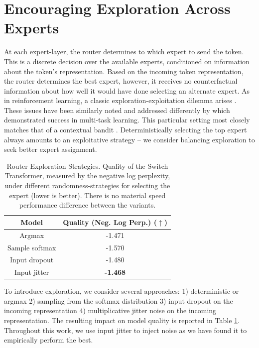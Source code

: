 \documentclass[twoside,11pt]{article}
\begin{document}
\section{Encouraging Exploration Across Experts}
At each expert-layer, the router determines to which expert to send the token.
This is a discrete decision over the available experts, conditioned on information about the token's representation.
Based on the incoming token representation, the router determines the best expert, however, it receives no counterfactual information about how well it would have done selecting an alternate expert.
As in reinforcement learning, a classic exploration-exploitation dilemma arises \citep{sutton2018reinforcement}.
These issues have been similarly noted and addressed differently by \cite{rosenbaum2017routing} which demonstrated success in multi-task learning.
This particular setting most closely matches that of a contextual bandit \citep{robbins1952some}.
Deterministically selecting the top expert always amounts to an exploitative strategy -- we consider balancing exploration to seek better expert assignment.


\begin{center}
\begin{table}[ht!]
\centering
\begin{tabular}{cc}
    \toprule
    {Model} & {Quality (Neg. Log Perp.) ($\uparrow$)}\\ \hline
    Argmax  & -1.471 \\ 
    Sample softmax  & -1.570 \\ 
    Input dropout  & -1.480 \\ 
    Input jitter  & \textbf{-1.468} \\ 
    \bottomrule
\end{tabular}
\caption{Router Exploration Strategies. Quality of the Switch Transformer, measured by the negative log perplexity, under different randomness-strategies for selecting the expert (lower is better). There is no material speed performance difference between the variants.}
\label{tab: top1_noise}
\end{table}
\end{center}

To introduce exploration, we consider several approaches: 1) deterministic or argmax 2) sampling from the softmax distribution 3) input dropout on the incoming representation 4) multiplicative jitter noise on the incoming representation.
The resulting impact on model quality is reported in Table \ref{tab: top1_noise}.
Throughout this work, we use input jitter to inject noise as we have found it to empirically perform the best.
\end{document}

